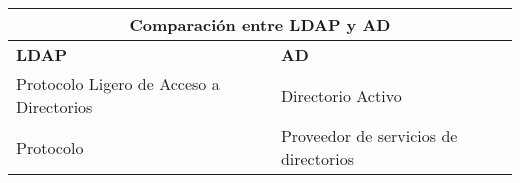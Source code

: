 
\begin{tabular}{ |p{4cm}| p{4cm} }
	\hline
	\multicolumn{2}{|c|}{\textbf{Comparación entre LDAP y AD}} \\
	\hline
	 \textbf{LDAP}&\textbf{AD}\\
	\hline
	Protocolo Ligero de Acceso a Directorios  &Directorio Activo\\
	\hline
	Protocolo&Proveedor de servicios de directorios\\
	\hline
\end{tabular}